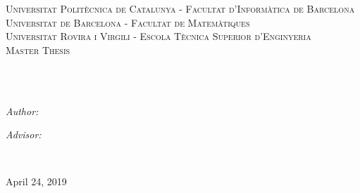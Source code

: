 \documentclass[
11pt, %
english, %
singlespacing, %
headsepline, %
]{MastersDoctoralThesis} %
\author{Santiago \textsc{Mazagatos P\'erez}} %
\begin{document}
\frontmatter %

\pagestyle{plain} %


\begin{titlepage}
\begin{center}

\vspace*{.06\textheight}
\textsc{\Large Universitat Polit\`ecnica de Catalunya - Facultat d'Inform\`atica de Barcelona}\\[0.5cm]
\textsc{\Large Universitat de Barcelona - Facultat de Matem\`atiques}\\[0.5cm]
\textsc{\Large Universitat Rovira i Virgili - Escola T\`ecnica Superior d'Enginyeria}\\[1cm]
\textsc{\Large Master Thesis}\\[0.5cm] %

\HRule \\[0.4cm] %
{\huge \bfseries \ttitle\par}\vspace{0.4cm} %
\HRule \\[1.5cm] %
 
\begin{minipage}[t]{0.4\textwidth}
\begin{flushleft} \large
\emph{Author:}\\
{\authorname} %
\end{flushleft}

\end{minipage}
\begin{minipage}[t]{0.4\textwidth}
\begin{flushright} \large
\emph{Advisor:} \\
{\supname} %
\end{flushright}
\end{minipage}\\[3cm]
 
\vfill

{\large April 24, 2019}\\[4cm] %
 
\vfill
\end{center}
\end{titlepage}
\end{document}
